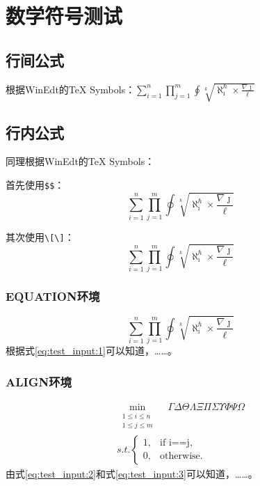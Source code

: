 \section{数学符号测试}
\subsection{行间公式}
根据WinEdt的\TeX{} Symbols：$\sum_{i=1}^{n}
\prod_{j=1}^{m}\oint\sqrt[k]{\aleph^\hbar_\imath\times\frac{\nabla\jmath}{\ell}}$
\subsection{行内公式}
同理根据WinEdt的\TeX{} Symbols：\par
首先使用\verb|$$|：$$\sum_{i=1}^{n}
\prod_{j=1}^{m}\oint\sqrt[k]{\aleph^\hbar_\imath\times\frac{\nabla\jmath}{\ell}}$$

其次使用\verb|\[\]|：\[\sum_{i=1}^{n}
\prod_{j=1}^{m}\oint\sqrt[k]{\aleph^\hbar_\imath\times\frac{\nabla\jmath}{\ell}}\]
\subsubsection{EQUATION环境}
\begin{equation}\label{eq:test_input:1}
\sum_{i=1}^{n}
\prod_{j=1}^{m}\oint\sqrt[k]{\aleph^\hbar_\imath\times\frac{\nabla\jmath}{\ell}}
\end{equation}
根据式\eqref{eq:test_input:1}可以知道，……。
\subsubsection{ALIGN环境}
\begin{align}
\min_{\substack{1\leq i\leq n \\ 1\leq j\leq m}}\quad \Gamma\Delta\Theta\Lambda\Xi\Pi\Sigma\Upsilon\Phi\Psi\Omega \label{eq:test_input:2} \\
s.t.\begin{cases}
      1, & \mbox{if i==j,}\\
      0, & \mbox{otherwise}.
    \end{cases}\label{eq:test_input:3}
\end{align}
由式\eqref{eq:test_input:2}和式\eqref{eq:test_input:3}可以知道，……。